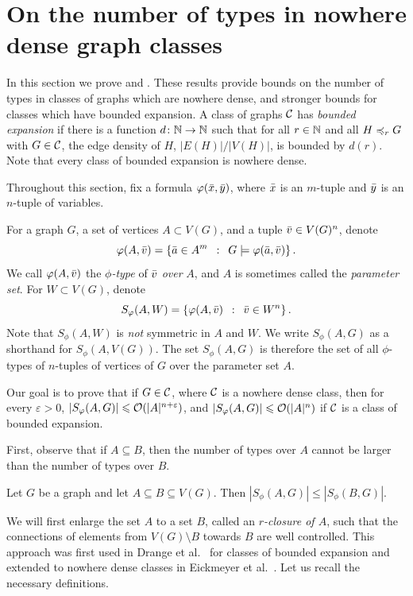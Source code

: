 \section{On the number of types in nowhere dense graph classes}

In this section we prove  and .
	These results provide bounds on the number of types in classes of graphs which are nowhere dense, 
	and stronger bounds for classes which have bounded expansion. 
A class of graphs $\mathcal{C}$ has \emph{bounded expansion}
	if there is a function $d\colon\mathbb{N}\rightarrow\mathbb{N}$ such that for all 
	$r\in \mathbb{N}$ and all $H\preccurlyeq_rG$ with $G\in\mathcal{C}$, the edge density
	of $H$, $|E(H)|/|V(H)|$, is bounded by $d(r)$. Note that every 
	class of bounded expansion is nowhere dense.
	
Throughout this section, fix a formula  $\varphi(\bar{x},\bar{y})$, where
$\bar{x}$ is an $m$-tuple and $\bar{y}$ is an $n$-tuple of variables.

For a graph $G$, a set of  vertices $A\subset V(G)$, and a tuple $\bar{v}\in V(G)^n$,
denote
\[\varphi(A,\bar{v})=\left\{\bar{a} \in A^m  \,~:~\,  G\models\varphi(\bar{a},\bar{v}) \right\}.\]
We call $\varphi(A,\bar{v})$ the \emph{$\phi$-type} of $\bar{v}$ \emph{over} $A$, and
$A$ is sometimes called the \emph{parameter set}.
For $W\subset V(G)$, denote
\[S_\varphi(A,W)=\left\{\varphi(A,\bar{v}) \,~:~\,  \bar{v}\in W^n \right\}.\]
Note that $S_\phi(A,W)$ is \emph{not} symmetric in $A$ and $W$.
We write $S_\phi(A,G)$ as a shorthand for $S_\phi(A,V(G))$. 
The set $S_\phi(A,G)$ is therefore the set of all $\phi$-types of $n$-tuples 
of vertices of $G$ over the parameter set $A$.

Our goal is to prove that if $G\in \mathcal{C}$, where $\mathcal{C}$ is a nowhere dense class,
then for every $\varepsilon>0$,   $|S_\varphi(A,G)|\leqslant \mathcal{O}(|A|^{n+\varepsilon})$, and 
$|S_\varphi(A,G)|\leqslant \mathcal{O}(|A|^n)$ if $\mathcal{C}$ is a class of bounded expansion.


First, observe that if $A\subseteq B$, then the number of types
over $A$ cannot be larger than the number of types over $B$. 

\begin{lemma}\label{lem:types-over-B}
Let $G$ be a graph and let $A\subseteq B\subseteq V(G)$. Then 
$|S_\phi(A,G)|\leq |S_\phi(B,G)|$. 
\end{lemma}

We will first enlarge the set $A$ to a set $B$, called
an \emph{$r$-closure of $A$}, such 
that the connections of elements from $V(G)\setminus B$ 
towards $B$ are well controlled. This approach
was first used in Drange et al.~\cite{drange2016kernelization} for
classes of bounded expansion and extended to nowhere dense
classes in Eickmeyer et al.~\cite{eickmeyer2016neighborhood}. 
Let us recall the necessary definitions.

